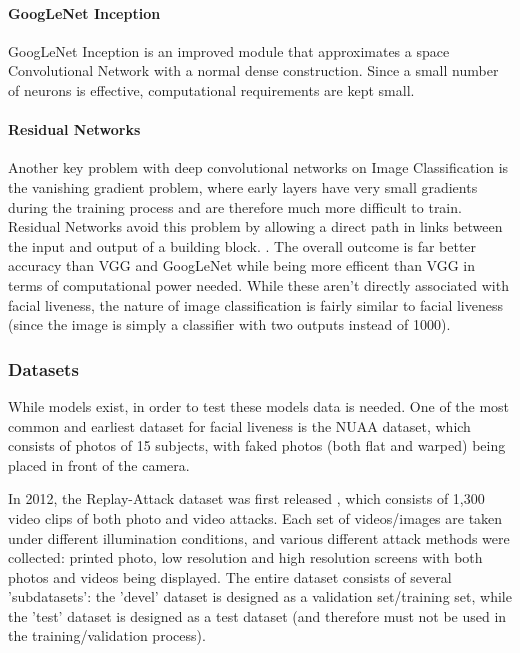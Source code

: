 \documentclass[10pt,a4paper]{article}
\begin{document}
        \paragraph{GoogLeNet Inception}
        GoogLeNet Inception is an improved module that approximates a space Convolutional Network with a normal
        dense construction. Since a small number of neurons is effective, computational requirements are kept small. 
        
        \paragraph{Residual Networks}
        Another key problem with deep convolutional networks on Image Classification is the vanishing gradient problem, where early layers have very small gradients during the training process and
        are therefore much more difficult to train. Residual Networks avoid this problem by allowing a direct path in links between the input and output of a building block. .
        The overall outcome is far better accuracy than VGG and GoogLeNet while being more efficent than VGG in terms of computational power needed. 
        While these aren't directly associated with facial liveness, the nature of image classification is fairly similar to facial liveness (since the image is simply a classifier with two outputs instead of 1000).


        \subsubsection{Datasets}
        While models exist, in order to test these models data is needed. One of the most common and earliest dataset for facial liveness is the NUAA dataset,
        which consists of photos of 15 subjects, with faked photos (both flat and warped) being placed in front of the camera. \cite{NUAADataset}

        In 2012, the Replay-Attack dataset was first released , which consists of 1,300 video clips of both photo and video attacks. Each
        set of videos/images are taken under different illumination conditions, and various different attack methods were collected: printed photo, low resolution and high resolution screens with both photos and 
        videos being displayed. The entire dataset consists of several 'subdatasets': the 'devel' dataset is designed as a validation set/training set, while
        the 'test' dataset is designed as a test dataset (and therefore must not be used in the training/validation process). \cite{ReplayAttackDataset}
\end{document}
